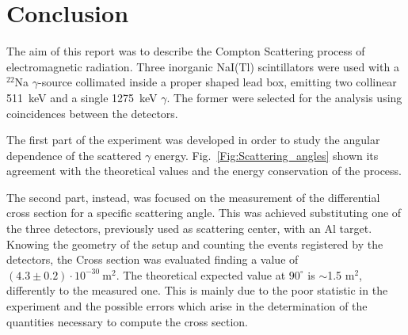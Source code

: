 \newpage
\section*{Conclusion}
The aim of this report was to describe the Compton Scattering process of electromagnetic radiation. Three inorganic NaI(Tl) scintillators were used with a $^{22}$Na $\gamma$-source collimated inside a proper shaped lead box,  emitting two collinear 511~keV  and a single 1275~keV $\gamma$. The former were selected for the analysis using coincidences between the detectors.

The first part of the experiment  was developed in order to study the angular dependence of the scattered $\gamma$ energy. Fig.~\ref{Fig:Scattering_angles} shown its agreement with the theoretical values and the energy conservation of the process.

The second part, instead, was focused on the measurement of the differential cross section for a specific scattering angle. This was achieved substituting one of the three detectors, previously used as scattering center, with an Al target. Knowing the geometry of the setup and counting the events registered by the detectors, the Cross section was evaluated finding a value of $(4.3\pm0.2)\cdot 10^{-30}\ \text{m}^{2}$.  The theoretical expected value at $90^\circ$ is $\sim$1.5 m$^2$, differently to the measured one. This is mainly due to the poor statistic in the experiment and the possible errors which arise in the determination of the quantities necessary to compute the cross section.
